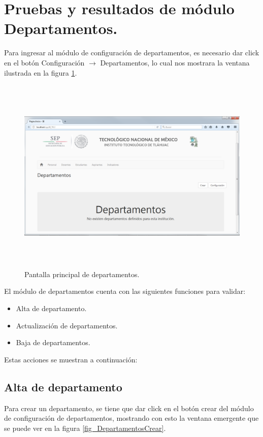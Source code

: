 		\section{Pruebas y resultados de m\'odulo Departamentos.}

			Para ingresar al m\'odulo de configuraci\'on de departamentos, es necesario dar click en el bot\'on Configuraci\'on $\rightarrow$  Departamentos, lo cual nos mostrara la ventana ilustrada en la figura \ref{fig_Departamentos}.

			\begin{figure}[H]
		        \centering
		        \includegraphics[width=16cm, height=9.5cm]{figuras/Departamentos}
		        \caption{Pantalla principal de departamentos.}
		        \label{fig_Departamentos}
		    \end{figure}

			El m\'odulo de departamentos cuenta con las siguientes funciones para validar:
			\begin{itemize}
				\item Alta de departamento.
				\item Actualizaci\'on de departamentos.
				\item Baja de departamentos.
			\end{itemize}

			Estas acciones se muestran a continuaci\'on:

			\subsection{Alta de departamento}

			Para crear un departamento, se tiene que dar click en el bot\'on crear del m\'odulo de configuraci\'on de departamentos, mostrando con esto la ventana emergente  que se puede ver en la figura \ref{fig_DepartamentosCrear}.

